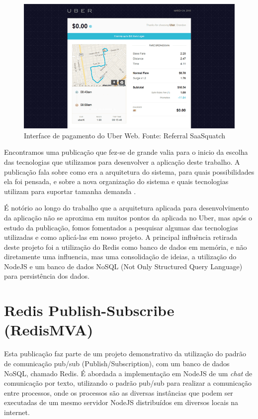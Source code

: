 \begin{figure}[!b]
	\centering
	\includegraphics[scale=0.7]{imagens/uber2.png}
	\caption{\small Interface de pagamento do Uber Web. Fonte: Referral SaaSquatch \cite{uber-imgs}}
	\label{fig:uber-payment-interface}
\end{figure}


Encontramos uma publicação \cite{uber-how-scales} que fez-se de grande valia para o inicio da escolha das tecnologias que utilizamos para desenvolver a aplicação deste trabalho. A publicação fala sobre como era a arquitetura do sistema, para quais possibilidades ela foi pensada, e sobre a nova organização do sistema e quais tecnologias utilizam para suportar tamanha demanda \cite{uber-statistics}.

É notório ao longo do trabalho que a arquitetura aplicada para desenvolvimento da aplicação não se aproxima em muitos pontos da aplicada no Uber, mas após o estudo da publicação, fomos fomentados a pesquisar algumas das tecnologias utilizadas e como aplicá-las em nosso projeto. A principal influência retirada deste projeto foi a utilização do Redis como banco de dados em memória, e não diretamente uma influencia, mas uma consolidação de ideias, a utilização do NodeJS e um banco de dados NoSQL (Not Only Structured Query Language) para persistência dos dados.

\section{Redis Publish-Subscribe (RedisMVA) }
Esta publicação \cite{redis-pubsub-redismva} faz parte de um projeto demonstrativo da utilização do padrão de comunicação pub/sub (Publish/Subscription), com um banco de dados NoSQL, chamado Redis. É abordada a implementação em NodeJS de um \textit{chat} de comunicação por texto, utilizando o padrão pub/sub para realizar a comunicação entre processos, onde os processos são as diversas instâncias que podem ser executadas de um mesmo servidor NodeJS distribuídos em diversos locais na internet.

